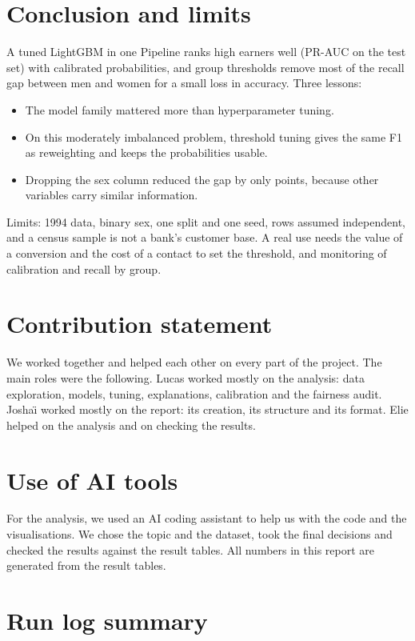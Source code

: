 \documentclass[11pt,a4paper]{article}
\begin{document}
\section{Conclusion and limits}
A tuned LightGBM in one Pipeline ranks high earners well (PR-AUC \testPrAuc{} on the test set) with calibrated probabilities, and group thresholds remove most of the recall gap between men and women for a small loss in accuracy. Three lessons:
\begin{itemize}
\item The model family mattered more than hyperparameter tuning.
\item On this moderately imbalanced problem, threshold tuning gives the same F1 as reweighting and keeps the probabilities usable.
\item Dropping the sex column reduced the gap by only \pairedNoSex{} points, because other variables carry similar information.
\end{itemize}

Limits: 1994 data, binary sex, one split and one seed, rows assumed independent, and a census sample is not a bank's customer base. A real use needs the value of a conversion and the cost of a contact to set the threshold, and monitoring of calibration and recall by group.

\newpage
\section*{Contribution statement}
We worked together and helped each other on every part of the project. The main roles were the following. Lucas worked mostly on the analysis: data exploration, models, tuning, explanations, calibration and the fairness audit. Josha\"{\i} worked mostly on the report: its creation, its structure and its format. Elie helped on the analysis and on checking the results.

\section*{Use of AI tools}
For the analysis, we used an AI coding assistant to help us with the code and the visualisations. We chose the topic and the dataset, took the final decisions and checked the results against the result tables. All numbers in this report are generated from the result tables.

\appendix
\section{Run log summary}\label{app:log}
\begin{table}[H]
\centering\small

\caption{Content of \texttt{runs/run\_log.csv}.}
\end{table}
\end{document}
